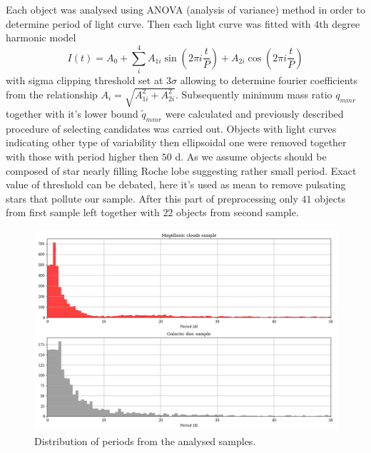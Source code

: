 \documentclass{pracalicmgr}
\begin{document}
Each object was analysed using ANOVA (analysis of variance) method \citep{schwarzenberg-czerny_advantage_1989} in order to determine period of light curve.
Then each light curve was fitted with $4$th degree harmonic model
\begin{equation}\label{harm}
    I(t)=A_0+\sum_i^4 A_{1i}\sin{\left(2\pi i\frac{t}{P}\right)}+A_{2i}\cos{\left(2\pi i\frac{t}{P}\right)}
\end{equation}
with sigma clipping threshold set at $3\sigma$ allowing to determine fourier coefficients from the relationship $A_i=\sqrt{A_{1i}^2+A_{2i}^2}$.
 Subsequently minimum mass ratio $q_{mmr}$ together with it's lower bound $\tilde{q}_{mmr}$ were calculated and previously described procedure of selecting candidates was carried out.
Objects with light curves indicating other type of variability then ellipsoidal one were removed together with those with period higher then
$50$ d. As we assume objects should be composed of star nearly filling Roche lobe suggesting rather small period. Exact value of threshold can be debated, here it's used as mean to 
remove pulsating stars that pollute our sample. After this part of preprocessing only $41$ objects from first sample left together with $22$ objects from second sample.
\begin{figure}
    \includegraphics[scale=0.5]{plots/periods.png}
    \caption{Distribution of periods from the analysed samples.}
\end{figure}
\end{document}
